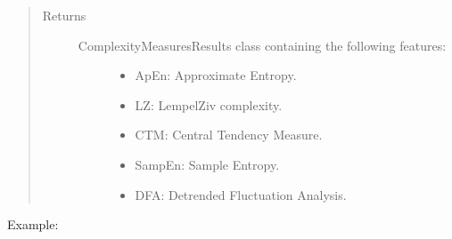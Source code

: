 \documentclass[letterpaper,10pt,english]{sphinxmanual}
\begin{document}
\begin{fulllineitems}
\begin{fulllineitems}
\begin{quote}
\begin{description}
\item[{Returns}] \leavevmode
\begin{description}
\item[{ComplexityMeasuresResults class containing the following features:}] \leavevmode\begin{itemize}
\item {} 
ApEn: Approximate Entropy.

\item {} 
LZ: Lempel\sphinxhyphen{}Ziv complexity.

\item {} 
CTM: Central Tendency Measure.

\item {} 
SampEn: Sample Entropy.

\item {} 
DFA: Detrended Fluctuation Analysis.

\end{itemize}

\end{description}


\end{description}\end{quote}

Example:

\begin{sphinxVerbatim}[commandchars=\\\{\}]
   

       

  
\end{sphinxVerbatim}

\end{fulllineitems}


\end{fulllineitems}
\end{document}
